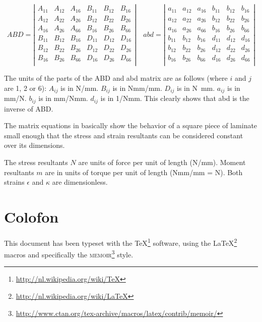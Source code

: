 \documentclass[a4paper,landscape,oneside,11pt,twocolumn]{memoir}
\begin{document}
\[
    ABD = \left|\begin{array}{cccccc}
        A_{11} & A_{12} & A_{16} & B_{11} & B_{12} & B_{16}\\
        A_{12} & A_{22} & A_{26} & B_{12} & B_{22} & B_{26}\\
        A_{16} & A_{26} & A_{66} & B_{16} & B_{26} & B_{66}\\
        B_{11} & B_{12} & B_{16} & D_{11} & D_{12} & D_{16}\\
        B_{12} & B_{22} & B_{26} & D_{12} & D_{22} & D_{26}\\
        B_{16} & B_{26} & B_{66} & D_{16} & D_{26} & D_{66}\\
    \end{array}\right|\quad
    abd = \left|\begin{array}{cccccc}
        a_{11} & a_{12} & a_{16} & b_{11} & b_{12} & b_{16}\\
        a_{12} & a_{22} & a_{26} & b_{12} & b_{22} & b_{26}\\
        a_{16} & a_{26} & a_{66} & b_{16} & b_{26} & b_{66}\\
        b_{11} & b_{12} & b_{16} & d_{11} & d_{12} & d_{16}\\
        b_{12} & b_{22} & b_{26} & d_{12} & d_{22} & d_{26}\\
        b_{16} & b_{26} & b_{66} & d_{16} & d_{26} & d_{66}\\
    \end{array}\right|
\]

The units of the parts of the ABD and abd matrix are as follows (where $i$ and
$j$ are 1, 2 or 6):
$A_{ij}$ is in \si{N/mm}. $B_{ij}$ is in \si{Nmm/mm}.  $D_{ij}$ is in \si{N.mm}.
$a_{ij}$ is in \si{mm/N}.  $b_{ij}$ is in \si{mm/Nmm}.  $d_{ij}$ is in
\si{1/Nmm}. This clearly shows that abd is the inverse of ABD.

The matrix equations in  basically show the
behavior of a square piece of laminate small enough that the stress and strain
resultants can be considered constant over its dimensions.

The stress resultants $N$ are units of force per unit of length (\si{N/mm}).
Moment resultants $m$ are in units of torque per unit of length (\si{Nmm/mm}
= \si{N}). Both strains $\epsilon$ and $\kappa$ are dimensionless.


%
%
\chapter{Colofon}

This document has been typeset with the
\TeX\footnote{\url{http://nl.wikipedia.org/wiki/TeX}}
software, using the \LaTeX\footnote{\url{http://nl.wikipedia.org/wiki/LaTeX}}
macros and specifically the
\textsc{memoir}\footnote{%
    \url{http://www.ctan.org/tex-archive/macros/latex/contrib/memoir/}} style.
\end{document}
